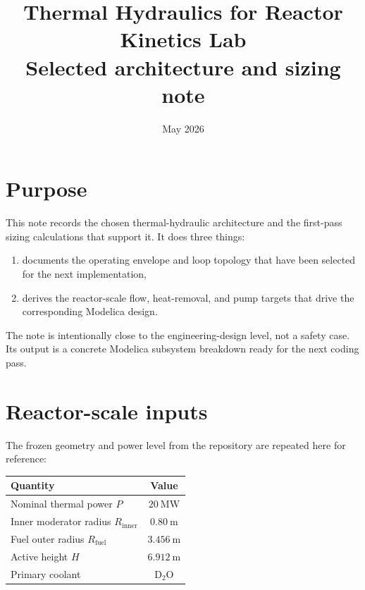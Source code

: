 \documentclass[11pt]{article}
\title{Thermal Hydraulics for Reactor Kinetics Lab\\[0.4em]
\large Selected architecture and sizing note}
\author{}
\date{May 2026}
\begin{document}
\maketitle
\tableofcontents
\newpage

\section{Purpose}

This note records the chosen thermal-hydraulic architecture and the
first-pass sizing calculations that support it.  It does three things:

\begin{enumerate}
  \item documents the operating envelope and loop topology that have been
        selected for the next implementation,
  \item derives the reactor-scale flow, heat-removal, and pump targets that
        drive the corresponding Modelica design.
\end{enumerate}

The note is intentionally close to the engineering-design level, not a
safety case.  Its output is a concrete Modelica subsystem breakdown ready
for the next coding pass.

\section{Reactor-scale inputs}

The frozen geometry and power level from the repository are repeated here
for reference:

\begin{center}
\begin{tabular}{lc}
\hline
Quantity & Value \\
\hline
Nominal thermal power $P$ & $20\ \mathrm{MW}$ \\
Inner moderator radius $R_{\mathrm{inner}}$ & $0.80\ \mathrm{m}$ \\
Fuel outer radius $R_{\mathrm{fuel}}$ & $3.456\ \mathrm{m}$ \\
Active height $H$ & $6.912\ \mathrm{m}$ \\
Primary coolant & D$_2$O \\
\hline
\end{tabular}
\end{center}
\end{document}
